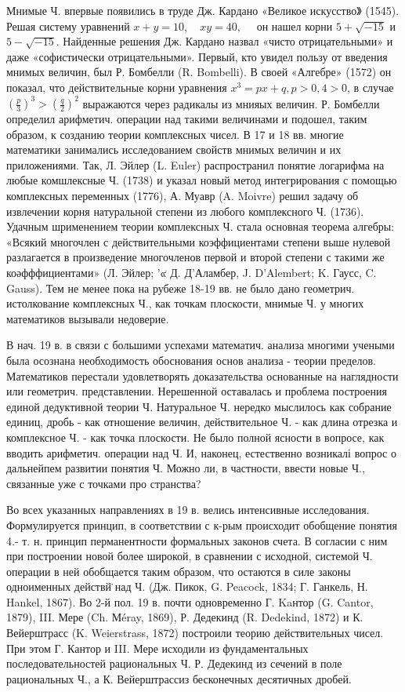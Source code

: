 \documentclass[10pt]{article}
\begin{document}
Мнимые Ч. впервые появились в труде Дж. Кардано «Великое искусство》 (1545). Решая систему уравнений $x+y=10, \quad x y=40, \quad$ он нашел корни $5+\sqrt{-15}$ и $5-\sqrt{-15}$. Найденные решения Дж. Кардано назвал «чисто отрицательными» и даже «софистически отрицательными». Первый, кто увидел пользу от введения мнимых величин, был Р. Бомбелли (R. Bombelli). В своей «Алгебре» (1572) он показал, что действительные корни уравнения $x^{3}=p x+q, p>0,4>0$, в случае $\left(\frac{p}{3}\right)^{3}>\left(\frac{q}{2}\right)^{2}$ выражаются через радикалы из мнияых величин. Р. Бомбелли определил арифметич. операции над такими величинами и подошел, таким образом, к созданию теории комплексных чисел. В 17 и 18 вв. многие математики занимались исследованием свойств мнимых величин и их приложениями. Так, Л. Эйлер (L. Euler) распространил понятие логарифма на любые комшлексные Ч. (1738) и указал новый метод интегрирования с помощью комплексных переменных (1776), А. Муавр (A. Moivre) решил задачу об извлечении корня натуральной степени из любого комплексного Ч. (1736). Удачным шрименением теории комплексных Ч. стала основная теорема алгебры: «Всякий многочлен с действительными коэффициентами степени выше нулевой разлагается в произведение многочленов первой и второй степени с такими же коәфффициентами» (Л. Эйлер; '๙ Д. Д'Аламбер, J. D'Alembert; K. Гаусс, C. Gauss). Тем не менее пока на рубеже 18-19 вв. не было дано геометрич. истолкование комплексных Ч., как точкам плоскости, мнимые Ч. у многих математиков вызывали недоверие.



В нач. 19 в. в связи с большими успехами математич. анализа многими учеными была осознана необходимость обоснования основ анализа - теории пределов. Математиков перестали удовлетворять доказательства основанные на наглядности или геометрич. представлении. Нерешенной оставалась и проблема построения единой дедуктивной теории Ч. Натуральное Ч. нередко мыслилось как собрание единиц, дробь - как отношение величин, действительное Ч. - как длина отрезка и комплексное Ч. - как точка плоскости. Не было полной ясности в вопросе, как вводить арифметич. операции над Ч. И, наконец, естественно возникалі вопрос о дальнейпем развитии понятия Ч. Можно ли, в частности, ввести новые Ч., связанные уже с точками про странства?



Во всех указанных направлениях в 19 в. велись интенсивные исследования. Формулируется принцип, в соответствии с к-рым происходит обобщение понятия 4.- т. н. принцип перманентности формальных законов счета. В согласии с ним при построении новой более широкой, в сравнении с исходной, системой Ч. операции в ней обобщается таким образом, что остаются в силе законы одноименных действй̈ над Ч. (Дж. Пикок, G. Peacock, 1834; Г. Ганкель, Н. Hankel, 1867). Во 2-й пол. 19 в. почти одновременно Г. Kaнтор (G. Cantor, 1879), III. Мере (Ch. Мéray, 1869), Р. Дедекинд (R. Dedekind, 1872) и К. Вейерштрасс (K. Weierstrass, 1872) построили теорию действительных чисел. При этом Г. Кантор и III. Мере исходили из фундаментальных последовательностей рациональных Ч. Р. Дедекинд из сечений в поле рациональных Ч., а К. Вейерштрассиз бесконечных десятичных дробей.
\end{document}
